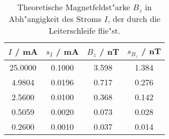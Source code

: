 \begin{table}[H]
\caption{Theoretische Magnetfeldst"arke $B_z$ in Abh"angigkeit des Stroms $I$, der durch die Leiterschleife flie"st.}
\begin{center}
\begin{tabular}{|c|c|c|c|}
  \hline
  $I$ / mA & $s_I$ / mA & $B_z$ / nT & $s_{B_z}$ / nT \\ \hline
  25.0000 & 0.1000 & 3.598 & 1.384 \\ \hline
  4.9804 & 0.0196 & 0.717 & 0.276 \\ \hline
  2.5600 & 0.0100 & 0.368 & 0.142 \\ \hline
  0.5059 & 0.0020 & 0.073 & 0.028 \\ \hline
  0.2600 & 0.0010 & 0.037 & 0.014 \\ \hline
\end{tabular}
\end{center}
\label{tab:B:theo}
\end{table}
